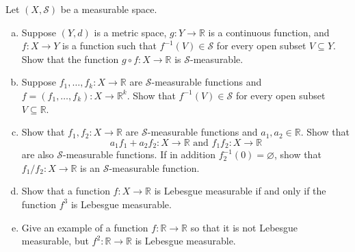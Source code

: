 \documentclass[10pt]{article}
\providecommand{\RR}{\mathbb R}
\providecommand{\ii}{\item}
\providecommand{\inv}{^{-1}}
\begin{document}
\pagebreak

\begin{problem}
    Let $(X,\mathcal S)$ be a measurable space.
    \begin{enumerate}[(a)]
        \ii Suppose $(Y,d)$ is a metric space,
	$g\colon Y\to\RR$ is a continuous function,
	and $f\colon X\to Y$ is a function such that $f\inv(V)\in\mathcal S$
	for every open subset $V\subseteq Y$.
	Show that the function $g\circ f\colon X\to\RR$
	is $\mathcal S$-measurable.
	\ii Suppose $f_1,\dots,f_k\colon X\to\RR$ are
	$\mathcal S$-measurable functions and
	$f = (f_1,\dots, f_k)\colon X\to\RR^k$.
	Show that $f\inv(V)\in\mathcal S$ for every
	open subset $V\subseteq\RR$.
	\ii Show that $f_1,f_2\colon X\to\RR$ are
	$\mathcal S$-measurable functions and $a_1,a_2\in\RR$.
	Show that
	\begin{equation*}
	    a_1f_1 + a_2f_2\colon X\to\RR\text{ and }f_1f_2\colon X\to\RR
	\end{equation*}
	are also $\mathcal S$-measurable functions.
	If in addition $f_2\inv(0) = \varnothing$, show that
	$f_1/f_2\colon X\to\RR$ is an $\mathcal S$-measurable function.
	\ii Show that a function $f\colon X\to\RR$ is Lebesgue measurable
	if and only if the function $f^3$ is Lebesgue measurable.
	\ii Give an example of a function $f\colon\RR\to\RR$
	so that it is not Lebesgue measurable,
	but $f^2\colon\RR\to\RR$ is Lebesgue measurable.
    \end{enumerate}
\end{problem}
\end{document}
